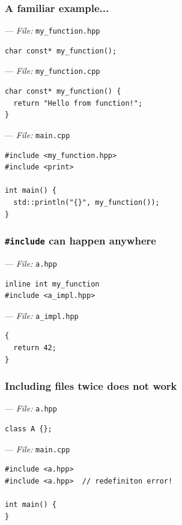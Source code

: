 \documentclass[aspectratio=169]{beamer}
\newif\iftransitions
\newcommand{\cpause}{\iftransitions \pause \fi}
\begin{document}
\begin{frame}[fragile]
  \frametitle{A familiar example...}
  
  --- \textit{File:} \texttt{my\_function.hpp}
  \begin{lstlisting}[style=cpp20]
char const* my_function();
  \end{lstlisting}

  --- \textit{File:} \texttt{my\_function.cpp}
  \begin{lstlisting}[style=cpp20]
char const* my_function() {
  return "Hello from function!";
}
  \end{lstlisting}

  \cpause
  --- \textit{File:} \texttt{main.cpp}
  \begin{lstlisting}[style=cpp20]
#include <my_function.hpp>
#include <print>

int main() {
  std::println("{}", my_function());
}
  \end{lstlisting}
  
  \note{
  }
\end{frame}

\begin{frame}[fragile]
  \frametitle{\texttt{\#include} can happen anywhere}
  --- \textit{File:} \texttt{a.hpp}
  \begin{lstlisting}[style=cpp20]
inline int my_function
#include <a_impl.hpp>
  \end{lstlisting}

  --- \textit{File:} \texttt{a\_impl.hpp}
  \begin{lstlisting}[style=cpp20]
{
  return 42;
}
  \end{lstlisting}
\end{frame}


\begin{frame}[fragile]
  \frametitle{Including files twice does not work}
  
  --- \textit{File:} \texttt{a.hpp}
  \begin{lstlisting}[style=cpp20]
class A {};
  \end{lstlisting}

  --- \textit{File:} \texttt{main.cpp}
  \begin{lstlisting}[style=cpp20]
#include <a.hpp>
#include <a.hpp>  // redefiniton error!

int main() {
}
  \end{lstlisting}
\end{frame}
\end{document}
